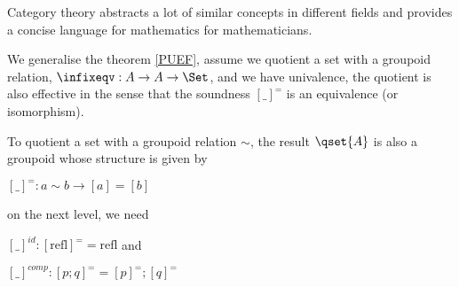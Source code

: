 Category theory abstracts a lot of similar concepts in different
fields and provides a concise language for mathematics for
mathematicians.











\begin{corollary}
We generalise the theorem \ref{PUEF}, assume we quotient a set with a groupoid relation, $\infixeqv: A \to A \to
\Set$, and we have univalence, the quotient is also effective in the sense that the soundness $[\_]^{=}$ is an equivalence (or isomorphism).
\end{corollary}

To quotient a set with a groupoid relation $\sim$, the result $\qset{A}$ is also a groupoid whose structure is given by 

$[\_]^{=} : a \sim b \to [a] = [b]$

on the next level, we need

$[\_]^{id}: [ \text{refl} ]^{=} = \text{refl}$ and

$[\_]^{comp}: [ p ; q ]^{=} =  [ p ]^{=} ; [ q ]^{=} $


